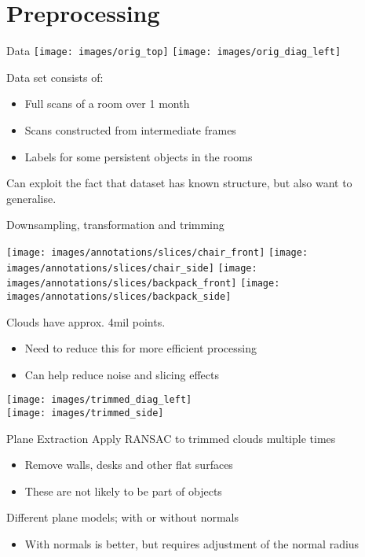\documentclass{beamer}
\begin{document}
\section{Preprocessing}
\begin{frame}{Data}
  \texttt{[image: images/orig\_top]}
  \texttt{[image: images/orig\_diag\_left]}
  
  Data set consists of:
  \begin{itemize}
  \item Full scans of a room over 1 month
  \item Scans constructed from intermediate frames
  \item Labels for some persistent objects in the rooms
  \end{itemize}
  Can exploit the fact that dataset has known structure, but also want to
  generalise.
\end{frame}
\begin{frame}{Downsampling, transformation and trimming}
  \begin{center}
    \texttt{[image: images/annotations/slices/chair\_front]}
    \texttt{[image: images/annotations/slices/chair\_side]}
    \texttt{[image: images/annotations/slices/backpack\_front]}
    \texttt{[image: images/annotations/slices/backpack\_side]}
  \end{center}
  Clouds have approx. 4mil points.
  \begin{itemize}
  \item Need to reduce this for more efficient processing
  \item Can help reduce noise and slicing effects
  \end{itemize}
\end{frame}
\begin{frame}
  \begin{center}
    \texttt{[image: images/trimmed\_diag\_left]}\\
    \texttt{[image: images/trimmed\_side]}
  \end{center}
\end{frame}
\begin{frame}{Plane Extraction}
  Apply RANSAC to trimmed clouds multiple times
  \begin{itemize}
  \item Remove walls, desks and other flat surfaces
  \item These are not likely to be part of objects
  \end{itemize}
  Different plane models; with or without normals
  \begin{itemize}
  \item With normals is better, but requires adjustment of the normal radius
  \end{itemize}
\end{frame}
\end{document}
